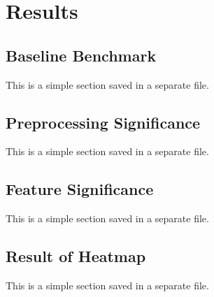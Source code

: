 \chapter[Results]{Results}
\label{chp:labelkey}
\begin{info}
\end{info}

\section{Baseline Benchmark}
\begin{info}{}
	This is a simple section saved in a separate file.
\end{info}

\section{Preprocessing Significance}
\begin{info}{}
	This is a simple section saved in a separate file.
\end{info}


\section{Feature Significance}
\begin{info}{}
	This is a simple section saved in a separate file.
\end{info}



\section{Result of Heatmap}
\begin{info}{}
	This is a simple section saved in a separate file.
\end{info}




